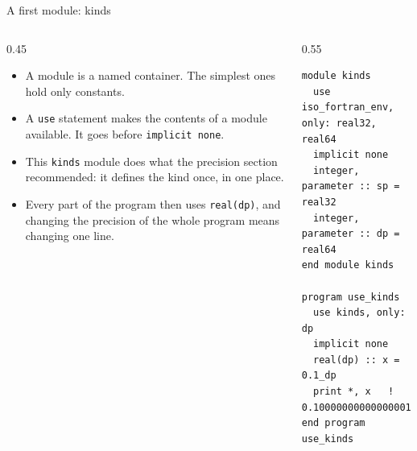 \begin{frame}[fragile]{A first module: kinds}
  \begin{columns}[T]
    \begin{column}{0.45\textwidth}
      \begin{itemize}
        \item A module is a named container. The simplest ones hold only constants.
        \item A \texttt{use} statement makes the contents of a module available. It goes before \texttt{implicit none}.
        \item This \texttt{kinds} module does what the precision section recommended: it defines the kind once, in one place.
        \item Every part of the program then uses \texttt{real(dp)}, and changing the precision of the whole program means changing one line.
      \end{itemize}
    \end{column}

    \begin{column}{0.55\textwidth}
      \begin{lstlisting}
module kinds
  use iso_fortran_env, only: real32, real64
  implicit none
  integer, parameter :: sp = real32
  integer, parameter :: dp = real64
end module kinds

program use_kinds
  use kinds, only: dp
  implicit none
  real(dp) :: x = 0.1_dp
  print *, x   ! 0.10000000000000001
end program use_kinds
      \end{lstlisting}
    \end{column}
  \end{columns}
\end{frame}


